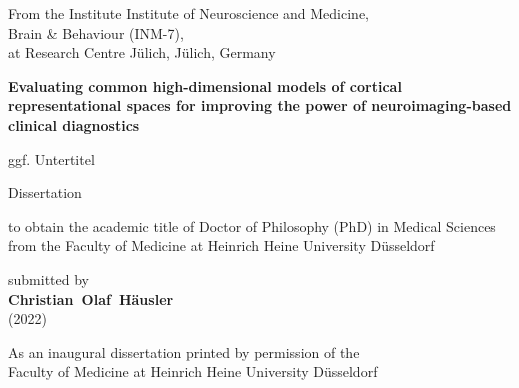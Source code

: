 \documentclass[english,12pt]{report}
\begin{document}
\pagestyle{plain}
\begin{spacing}{1.5}


\begin{titlepage}
\begin{center}

From the Institute Institute of Neuroscience and Medicine,\\
Brain \& Behaviour (INM-7),\\
at Research Centre Jülich, Jülich, Germany

\vfill

    \textbf{{\large Evaluating common high-dimensional models of cortical
    representational spaces for improving the power of neuroimaging-based
    clinical diagnostics}}

ggf. Untertitel

\vfill

{\large Dissertation}

\vfill

to obtain the academic title of Doctor of Philosophy (PhD) in Medical Sciences\\
from the Faculty of Medicine at Heinrich Heine University Düsseldorf

\vfill

submitted by\\
\textbf{Christian~Olaf~Häusler}\\
(2022)

\end{center}
\end{titlepage}




\newpage



\vfill
\noindent As an inaugural dissertation printed by permission of the\\
Faculty of Medicine at Heinrich Heine University Düsseldorf


\end{spacing}
\end{document}
